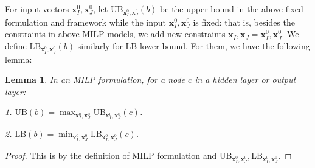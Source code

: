 \documentclass[]{article}
\newtheorem{lemma}{Lemma}
\theoremstyle{definition}
\newcommand{\UB}{\mathrm{UB}}
\newcommand{\LB}{\mathrm{LB}}
\begin{document}
For input vectors $\boldsymbol{x}^0_I,\boldsymbol{x}^0_J$, let $\UB_{\boldsymbol{x}^0_I,\boldsymbol{x}^0_J}(b)$ be the upper bound in the above fixed formulation and framework while the input $\boldsymbol{x}^0_I,\boldsymbol{x}^0_J$ is fixed: that is, besides the constraints in above MILP models, we add new constraints $\boldsymbol{x}_I,\boldsymbol{x}_J=\boldsymbol{x}^0_I,\boldsymbol{x}^0_J$. We  define $\LB_{\boldsymbol{x}^0_I,\boldsymbol{x}^0_J}(b)$ similarly for $\LB$ lower bound. For them, we have the following lemma:

\begin{lemma} In an MILP formulation, for a node $c$ in a hidden layer or output layer:
	
	1. $\UB(b)=\max_{\boldsymbol{x}^0_I,\boldsymbol{x}^0_J}\UB_{\boldsymbol{x}^0_I,\boldsymbol{x}^0_J}(c)$. 
	
		2. $\LB(b)=\min_{\boldsymbol{x}^0_I,\boldsymbol{x}^0_J}\LB_{\boldsymbol{x}^0_I,\boldsymbol{x}^0_J}(c)$. 
\end{lemma}

\begin{proof}
	This is by the definition of MILP formulation and $\UB_{\boldsymbol{x}^0_I,\boldsymbol{x}^0_J}, \LB_{\boldsymbol{x}^0_I,\boldsymbol{x}^0_J}$.
\end{proof}
\end{document}
